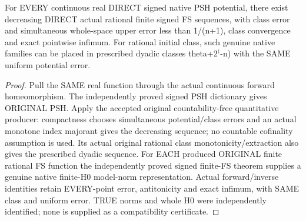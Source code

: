 \begin{theorem}
\label{thm:seven-native-signed-continuous-regularization-arbitrary-field}
\leanok
For EVERY continuous real DIRECT signed native PSH potential, there
exist decreasing DIRECT actual rational finite signed FS sequences,
with class error and simultaneous whole-space upper error less than
1/(n+1), class convergence and exact pointwise infimum. For rational
initial class, such genuine native families can be placed in prescribed
dyadic classes theta+$2^($-n) with the SAME uniform potential error.
\end{theorem}
\begin{proof}
Pull the SAME real function through the actual continuous forward
homeomorphism. The independently proved signed PSH dictionary gives
ORIGINAL PSH. Apply the accepted original countability-free quantitative
producer: compactness chooses simultaneous potential/class errors and
an actual monotone index majorant gives the decreasing sequence; no
countable cofinality assumption is used. Its actual original rational
class monotonicity/extraction also gives the prescribed dyadic sequence.
For EACH produced ORIGINAL finite rational FS function the independently
proved signed finite-FS theorem supplies a genuine native finite-H0
model-norm representation. Actual forward/inverse identities retain
EVERY-point error, antitonicity and exact infimum, with SAME class and
uniform error. TRUE norms and whole H0 were independently identified;
none is supplied as a compatibility certificate.
\end{proof}

